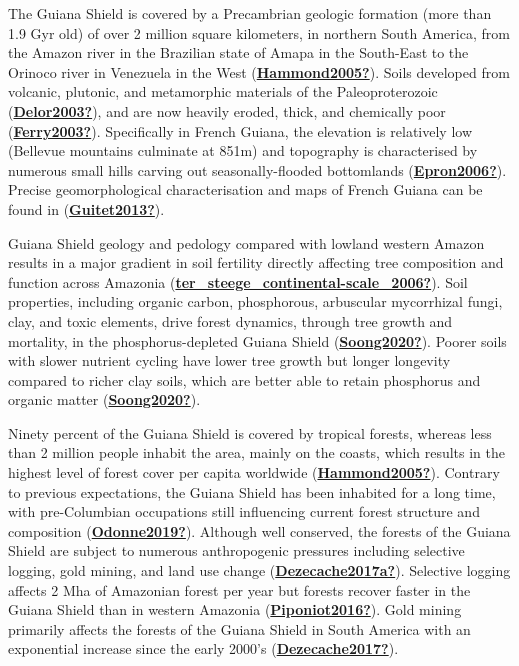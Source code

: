 \documentclass[12pt,twoside,a4paper, a]{article}
\begin{document}
The Guiana Shield is covered by a Precambrian geologic formation (more than 1.9 Gyr old) of over 2 million square kilometers, in northern South America, from the Amazon river in the Brazilian state of Amapa in the South-East to the Orinoco river in Venezuela in the West (\protect\hyperlink{ref-Hammond2005}{\textbf{Hammond2005?}}).
Soils developed from volcanic, plutonic, and metamorphic materials of the Paleoproterozoic (\protect\hyperlink{ref-Delor2003}{\textbf{Delor2003?}}),
and are now heavily eroded, thick, and chemically poor (\protect\hyperlink{ref-Ferry2003}{\textbf{Ferry2003?}}).
Specifically in French Guiana, the elevation is relatively low (Bellevue mountains culminate at 851m) and topography is characterised by numerous small hills carving out seasonally-flooded bottomlands (\protect\hyperlink{ref-Epron2006}{\textbf{Epron2006?}}).
Precise geomorphological characterisation and maps of French Guiana can be found in (\protect\hyperlink{ref-Guitet2013}{\textbf{Guitet2013?}}).

Guiana Shield geology and pedology compared with lowland western Amazon results in a major gradient in soil fertility directly affecting tree composition and function across Amazonia (\protect\hyperlink{ref-ter_steege_continental-scale_2006}{\textbf{ter\_steege\_continental-scale\_2006?}}).
Soil properties, including organic carbon, phosphorous, arbuscular mycorrhizal fungi, clay, and toxic elements, drive forest dynamics, through tree growth and mortality, in the phosphorus-depleted Guiana Shield (\protect\hyperlink{ref-Soong2020}{\textbf{Soong2020?}}).
Poorer soils with slower nutrient cycling have lower tree growth but longer longevity compared to richer clay soils, which are better able to retain phosphorus and organic matter (\protect\hyperlink{ref-Soong2020}{\textbf{Soong2020?}}).

Ninety percent of the Guiana Shield is covered by tropical forests, whereas less than 2 million people inhabit the area, mainly on the coasts, which results in the highest level of forest cover per capita worldwide (\protect\hyperlink{ref-Hammond2005}{\textbf{Hammond2005?}}).
Contrary to previous expectations, the Guiana Shield has been inhabited for a long time,
with pre-Columbian occupations still influencing current forest structure and composition (\protect\hyperlink{ref-Odonne2019}{\textbf{Odonne2019?}}).
Although well conserved, the forests of the Guiana Shield are subject to numerous anthropogenic pressures including selective logging, gold mining, and land use change (\protect\hyperlink{ref-Dezecache2017a}{\textbf{Dezecache2017a?}}).
Selective logging affects 2 Mha of Amazonian forest per year but forests recover faster in the Guiana Shield than in western Amazonia (\protect\hyperlink{ref-Piponiot2016}{\textbf{Piponiot2016?}}).
Gold mining primarily affects the forests of the Guiana Shield in South America with an exponential increase since the early 2000's (\protect\hyperlink{ref-Dezecache2017}{\textbf{Dezecache2017?}}).
\end{document}
